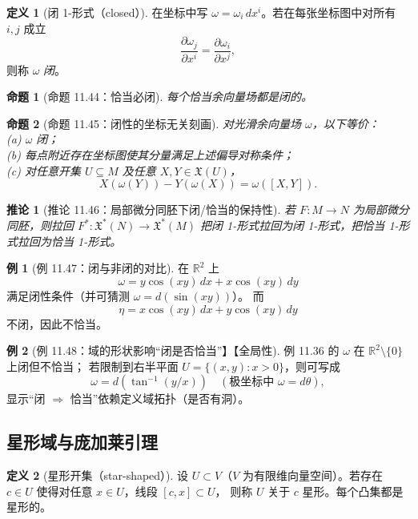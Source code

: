 \documentclass[12pt,a4paper]{article}
\theoremstyle{definition}
\newtheorem{definition}{定义}[section]
\newtheorem{example}{例}[section]
\theoremstyle{plain}
\newtheorem{proposition}{命题}[section]
\newtheorem{corollary}{推论}[section]
\newcommand{\R}{\mathbb{R}}
\newcommand{\X}{\mathfrak{X}}
\begin{document}
\begin{definition}[闭 1-形式（closed）]
在坐标中写 $\omega=\omega_i\,dx^i$。若在每张坐标图中对所有 $i,j$ 成立
\[
\frac{\partial\omega_j}{\partial x^i}=\frac{\partial\omega_i}{\partial x^j},
\]
则称 $\omega$ \emph{闭}。
\end{definition}

\begin{proposition}[命题 11.44：恰当必闭]
每个恰当余向量场都是闭的。
\end{proposition}

\begin{proposition}[命题 11.45：闭性的坐标无关刻画]
对光滑余向量场 $\omega$，以下等价：\\
(a) $\omega$ 闭；\\
(b) 每点附近存在坐标图使其分量满足上述偏导对称条件；\\
(c) 对任意开集 $U\subseteq M$ 及任意 $X,Y\in\X(U)$，
\[
X(\omega(Y)) - Y(\omega(X)) = \omega([X,Y]).
\]
\end{proposition}

\begin{corollary}[推论 11.46：局部微分同胚下闭/恰当的保持性]
若 $F:M\to N$ 为局部微分同胚，则拉回 $F^*:\X^*(N)\to\X^*(M)$
把闭 1-形式拉回为闭 1-形式，把恰当 1-形式拉回为恰当 1-形式。
\end{corollary}

\begin{example}[例 11.47：闭与非闭的对比]
在 $\R^2$ 上
\[
\omega=y\cos(xy)\,dx+x\cos(xy)\,dy
\]
满足闭性条件（并可猜测 $\omega=d(\sin(xy))$）。
而
\[
\eta=x\cos(xy)\,dx+y\cos(xy)\,dy
\]
不闭，因此不恰当。
\end{example}

\begin{example}[例 11.48：域的形状影响“闭是否恰当”】【全局性]
例 11.36 的 $\omega$ 在 $\R^2\setminus\{0\}$ 上闭但不恰当；
若限制到右半平面 $U=\{(x,y):x>0\}$，则可写成
\[
\omega=d(\tan^{-1}(y/x))\quad(\text{极坐标中 } \omega=d\theta),
\]
显示“闭 $\Rightarrow$ 恰当”依赖定义域拓扑（是否有洞）。
\end{example}

\subsection{星形域与庞加莱引理}

\begin{definition}[星形开集（star-shaped）]
设 $U\subset V$（$V$ 为有限维向量空间）。若存在 $c\in U$ 使得对任意 $x\in U$，线段 $[c,x]\subset U$，
则称 $U$ 关于 $c$ 星形。每个凸集都是星形的。
\end{definition}
\end{document}
